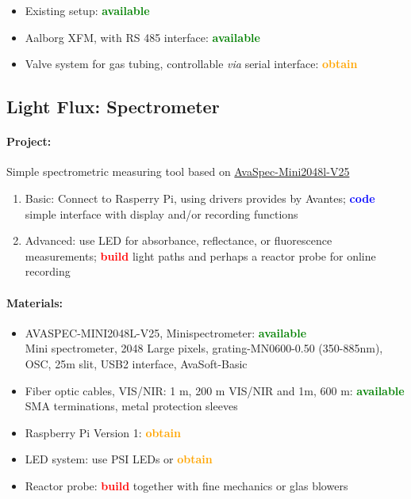 \documentclass[12pt,a4paper]{scrartcl}
\newcommand{\obtain}[0]{\textcolor{orange}{\textbf{obtain}}}
\newcommand{\avail}[0]{\textcolor{green}{\textbf{available}}}
\newcommand{\build}[0]{\textcolor{red}{\textbf{build}}}
\newcommand{\code}[0]{\textcolor{blue}{\textbf{code}}}
\begin{document}
\begin{itemize}
\item Existing setup: \avail{}
\item Aalborg XFM, with RS 485 interface: \avail{}
\item Valve system for gas tubing, controllable \textit{via} serial
  interface: \obtain{}
\end{itemize}

\newpage
\subsection{Light Flux: Spectrometer} 
\label{spec}
\paragraph{Project:} 
Simple spectrometric measuring tool based on
\href{http://www.avantes.com/products/spectrometers/compactline/item/723-avaspec-mini}{AvaSpec-Mini2048l-V25}

\begin{enumerate}
\item Basic: Connect to Rasperry Pi, using drivers provides by
  Avantes; \code{} simple interface with display and/or recording
  functions
\item Advanced: use LED for absorbance, reflectance, or fluorescence
  measurements; \build{} light paths and perhaps a reactor probe for
  online recording
\end{enumerate}

\paragraph{Materials:}
\begin{itemize}
\item AVASPEC-MINI2048L-V25, Minispectrometer: \avail{}\\ Mini
  spectrometer, 2048 Large pixels, grating-MN0600-0.50 (350-885nm),
  OSC, 25\textmu{}m slit, USB2 interface, AvaSoft-Basic
\item Fiber optic cables, VIS/NIR: 1 m, 200 \textmu{}m VIS/NIR and 1m,
  600 \textmu{}m: \avail{}\\
  SMA terminations, metal protection sleeves
\item Raspberry Pi Version 1: \obtain{}
\item LED system: use PSI LEDs or \obtain{}
\item Reactor probe: \build{} together with fine mechanics or glas
  blowers
\end{itemize}
\end{document}
